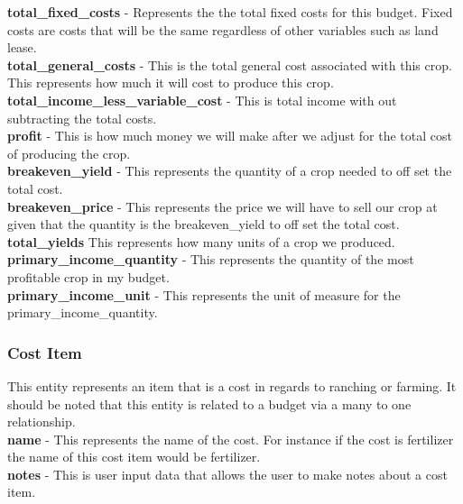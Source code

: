 \documentclass[onecolumn, draftclsnofoot,10pt, compsoc]{article}
\begin{document}
				\textbf{total\_fixed\_costs} - Represents the the total fixed costs for this budget. Fixed costs are costs that will be the same regardless of other variables such as land lease.\\

				\textbf{total\_general\_costs} - This is the total general cost associated with this crop. This represents how much it will cost to produce this crop.\\

				\textbf{total\_income\_less\_variable\_cost} - This is total income with out subtracting the total costs.\\

				\textbf{profit} - This is how much money we will make after we adjust for the total cost of producing the crop.\\

				\textbf{breakeven\_yield} - This represents the quantity of a crop needed to off set the total cost.\\

				\textbf{breakeven\_price} - This represents the price we will have to sell our crop at given that the quantity is the breakeven\_yield to off set the total cost.\\

				\textbf{total\_yields} \- This represents how many units of a crop we produced.\\

				\textbf{primary\_income\_quantity} - This represents the quantity of the most profitable crop in my budget.\\

				\textbf{primary\_income\_unit} - This represents the unit of measure for the primary\_income\_quantity.\\

			\subsubsection{Cost Item}
				This entity represents an item that is a cost in regards to ranching or farming. It should be noted that this entity is related to a budget via a many to one relationship.\\

				\textbf{name} - This represents the name of the cost. For instance if the cost is fertilizer the name of this cost item would be fertilizer.\\

				\textbf{notes} - This is user input data that allows the user to make notes about a cost item.\\
\end{document}
